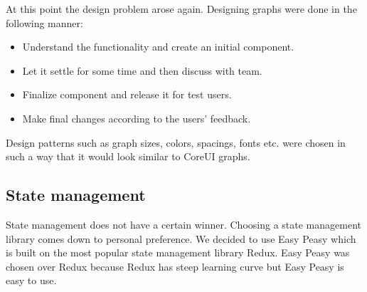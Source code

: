 At this point the design problem arose again.
Designing graphs were done in the following manner:
\begin{itemize}
    \item Understand the functionality and create an initial component.
    \item Let it settle for some time and then discuss with team.
    \item Finalize component and release it for test users.
    \item Make final changes according to the users' feedback.
\end{itemize}
Design patterns such as graph sizes, colors, spacings, fonts etc. were chosen in such a way that it would look similar to CoreUI graphs.

\subsection{State management}\label{subsec:state-management}
State management does not have a certain winner.
Choosing a state management library comes down to personal preference.
We decided to use Easy Peasy which is built on the most popular state management library Redux.
Easy Peasy was chosen over Redux because Redux has steep learning curve but Easy Peasy is easy to use.
